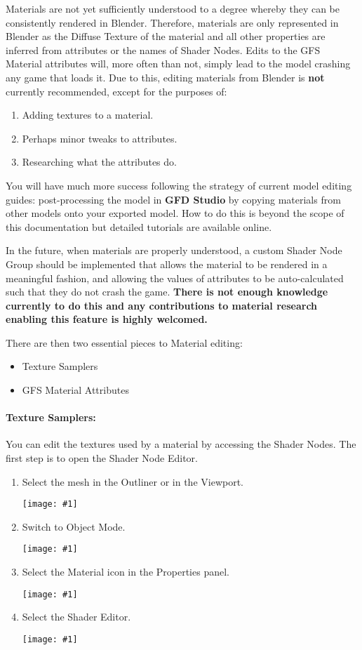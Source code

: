 \documentclass{article}
\newenvironment{guide}[1]
{
	\begin{center}
		\begin{tcolorbox}[%
			colback=black!20, 
			boxrule=0pt, 
			title=Step-by-step: #1,
			enhanced,
			breakable,
			overlay unbroken={%
                \draw[line width=1pt, black, rounded corners]
        	    (frame.north west) rectangle (frame.south east);
			},
    		overlay first={%
        		 \draw[line width=1pt, black, rounded corners]
        	    (frame.south west) -- (frame.north west) -- (frame.north east) -- (frame.south east);
                \draw[line width=1pt, black]
                (frame.south west) -- (frame.south east);
            },
    		overlay middle={%
                \draw[line width=1pt, black]
        	    (frame.north west) rectangle (frame.south east);
        	},
    		overlay last={%
                \draw[line width=1pt, black, rounded corners]
        	    (frame.north west) -- (frame.south west) -- (frame.south east) -- (frame.north east);
                \draw[line width=1pt, black]
                (frame.north west) -- (frame.north east);
           	}
        ]{}
    	\begin{enumerate}
}
{
    		\end{enumerate}
    	\end{tcolorbox}
	\end{center}  	 
}
\newcommand{\guideimage}[1]
{
	\begin{center}
		\texttt{[image: \#1]}
	\end{center}
}
\begin{document}
Materials are not yet sufficiently understood to a degree whereby they can be consistently rendered in Blender. Therefore, materials are only represented in Blender as the Diffuse Texture of the material and all other properties are inferred from attributes or the names of Shader Nodes. Edits to the GFS Material attributes will, more often than not, simply lead to the model crashing any game that loads it. Due to this, editing materials from Blender is \textbf{not} currently recommended, except for the purposes of:
\begin{enumerate}
\item Adding textures to a material.
\item Perhaps minor tweaks to attributes.
\item Researching what the attributes do.
\end{enumerate}
You will have much more success following the strategy of current model editing guides: post-processing the model in \textbf{GFD Studio} by copying materials from other models onto your exported model. How to do this is beyond the scope of this documentation but detailed tutorials are available online.

In the future, when materials are properly understood, a custom Shader Node Group should be implemented that allows the material to be rendered in a meaningful fashion, and allowing the values of attributes to be auto-calculated such that they do not crash the game. \textbf{There is not enough knowledge currently to do this and any contributions to material research enabling this feature is highly welcomed.}

There are then two essential pieces to Material editing:
\begin{itemize}
\item Texture Samplers
\item GFS Material Attributes
\end{itemize}

\paragraph{Texture Samplers:}You can edit the textures used by a material by accessing the Shader Nodes. The first step is to open the Shader Node Editor.
\begin{guide}{Opening the Shader Node Editor}
\item Select the mesh in the Outliner or in the Viewport.
\guideimage{images/editing_models/edits_select_mesh.png}
\item Switch to Object Mode.
\guideimage{images/editing_models/edits_to_object_mode.png}
\item Select the Material icon in the Properties panel.
\guideimage{images/editing_models/edits_select_material.png}
\item Select the Shader Editor.
\guideimage{images/editing_models/edits_open_shader_nodes.png}
\end{guide}
\end{document}
